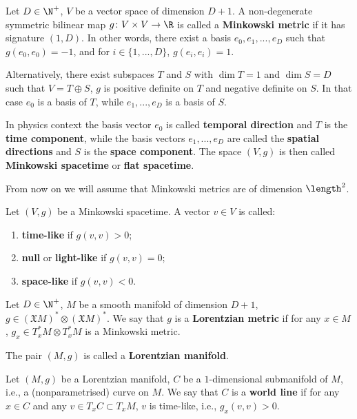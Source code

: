 \begin{definition}
  Let $D \in \N^+$, $V$ be a vector space of dimension $D + 1$.
  A non-degenerate symmetric bilinear map $g \colon V \times V \to \R$ is called
  a \textbf{Minkowski metric} if it has signature $(1, D)$.
  In other words, there exist a basis $e_0, e_1, ..., e_D$ such that
  $g(e_0, e_0) = -1$, and for $i \in \{1, ..., D\}$, $g(e_i, e_i) = 1$.

  Alternatively, there exist subspaces $T$ and $S$ with $\dim T = 1$ and
  $\dim S = D$ such that $V = T \oplus S$, $g$ is positive definite on $T$ and
  negative definite on $S$.
  In that case $e_0$ is a basis of $T$, while $e_1, ..., e_D$ is a basis of $S$.

  In physics context the basis vector $e_0$ is called
  \textbf{temporal direction} and $T$ is the \textbf{time component},
  while the basis vectors $e_1, ..., e_D$ are called the
  \textbf{spatial directions} and $S$ is the \textbf{space component}.
  The space $(V, g)$ is then called \textbf{Minkowski spacetime} or
  \textbf{flat spacetime}.
\end{definition}
\begin{remark}
  From now on we will assume that Minkowski metrics are of dimension
  $\length^2$.
\end{remark}
\begin{definition}
  Let $(V, g)$ be a Minkowski spacetime.
  A vector $v \in V$ is called:
  \begin{enumerate}
    \item \textbf{time-like} if $g(v, v) > 0$;
    \item \textbf{null} or \textbf{light-like} if $g(v, v) = 0$;
    \item \textbf{space-like} if $g(v, v) < 0$.
  \end{enumerate}
\end{definition}
\begin{definition}
  Let $D \in \N^+$, $M$ be a smooth manifold of dimension $D + 1$,
  $g \in (\mathfrak{X} M)^* \otimes (\mathfrak{X} M)^*$.
  We say that $g$ is a \textbf{Lorentzian metric} if for any $x \in M$,
  $g_x \in T_x^* M \otimes T_x^* M$ is a Minkowski metric.

  The pair $(M, g)$ is called a \textbf{Lorentzian manifold}.
\end{definition}
\begin{definition}
  Let $(M, g)$ be a Lorentzian manifold, $C$ be a $1$-dimensional submanifold of
  $M$, i.e., a (nonparametrised) curve on $M$.
  We say that $C$ is a \textbf{world line} if for any $x \in C$ and any
  $v \in T_x C \subset T_x M$, $v$ is time-like, i.e., $g_x(v, v) > 0$.
\end{definition}
